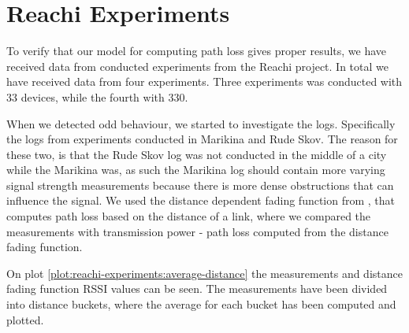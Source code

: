 \section{Reachi Experiments}
To verify that our model for computing path loss gives proper results, we have received data from conducted
experiments from the Reachi project. In total we have received data from four experiments. Three experiments
was conducted with 33 devices, while the fourth with 330.

When we detected odd behaviour, we started to investigate the logs. Specifically the logs from experiments
conducted in Marikina and Rude Skov. The reason for these two, is that the Rude Skov log was not conducted in
the middle of a city while the Marikina was, as such the Marikina log should contain more varying signal
strength measurements because there is more dense obstructions that can influence the signal. We used the
distance dependent fading function from \cite{paper:linkmodel}, that computes path loss based on the distance
of a link, where we compared the measurements with transmission power - path loss computed from the distance
fading function.

On plot \ref{plot:reachi-experiments:average-distance} the measurements and distance fading function RSSI
values can be seen. The measurements have been divided into distance buckets, where the average for each
bucket has been computed and plotted.

